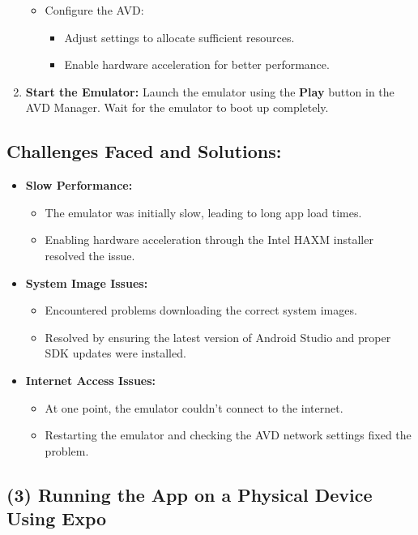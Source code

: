 \documentclass[12pt]{article}
\begin{document}
\begin{enumerate}
\begin{itemize}
\begin{itemize}
        \end{itemize}
        \item Configure the AVD:
        \begin{itemize}
            \item Adjust settings to allocate sufficient resources.
            \item Enable hardware acceleration for better performance.
        \end{itemize}
    \end{itemize}
    \item \textbf{Start the Emulator:}
    Launch the emulator using the \textbf{Play} button in the AVD Manager. Wait for the emulator to boot up completely.
\end{enumerate}
\subsection*{Challenges Faced and Solutions:}
\begin{itemize}
    \item \textbf{Slow Performance:} 
    \begin{itemize}
        \item The emulator was initially slow, leading to long app load times.
        \item Enabling hardware acceleration through the Intel HAXM installer resolved the issue.
    \end{itemize}
    \item \textbf{System Image Issues:} 
    \begin{itemize}
        \item Encountered problems downloading the correct system images.
        \item Resolved by ensuring the latest version of Android Studio and proper SDK updates were installed.
    \end{itemize}
    \item \textbf{Internet Access Issues:} 
    \begin{itemize}
        \item At one point, the emulator couldn’t connect to the internet.
        \item Restarting the emulator and checking the AVD network settings fixed the problem.
    \end{itemize}
\end{itemize}
\subsection*{(3) Running the App on a Physical Device Using Expo}
\end{document}
